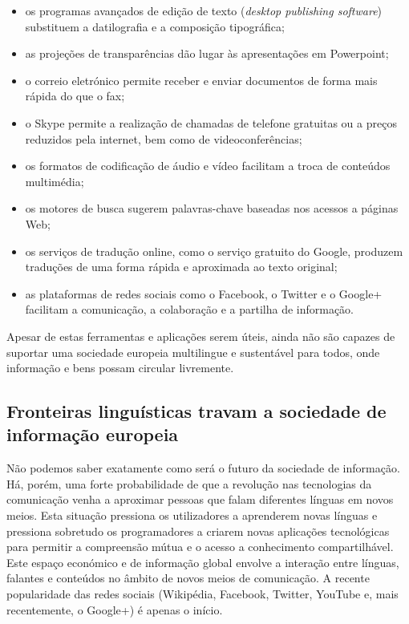 \documentclass[]{../metanetpaper}
\begin{document}
\begin{multicols}{2}
\begin{itemize}
      \item os programas avançados de edição de texto (\textit{desktop publishing software}) substituem a datilografia e a composição tipográfica;
      \item as projeções de transparências dão lugar às apresentações em Powerpoint;
      \item o correio eletrónico permite receber e enviar do\-cu\-men\-tos de forma mais rápida do que o fax;
      \item o Skype permite a realização de chamadas de telefone gratuitas ou a preços reduzidos pela internet, bem como de videoconferências;
      \item os formatos de codificação de áudio e vídeo facilitam a troca de conteúdos multimédia;
      \item os motores de busca sugerem palavras-chave baseadas nos acessos a páginas Web;
      \item os serviços de tradução online, como o serviço gratuito do Google, produzem traduções de uma forma rápida e aproximada ao texto original;
      \item as plataformas de redes sociais como o Facebook, o Twitter e o Google+  facilitam a comunicação, a colaboração e a partilha de informação.
\end{itemize}

 Apesar de estas ferramentas e aplicações serem úteis, ainda não são capazes de suportar uma sociedade europeia multilingue e sustentável para todos, onde informação e bens possam circular livremente.

\subsection{Fronteiras linguísticas travam a sociedade de in\-for\-ma\-ção eu\-ro\-peia}
  
Não podemos saber exatamente como será o futuro da sociedade de informação. Há, porém, uma forte probabilidade de que a revolução nas tecnologias da comunicação venha a aproximar pessoas que falam diferentes línguas em novos meios. Esta situação pressiona os utilizadores a aprenderem novas línguas e pressiona sobretudo os programadores a criarem novas aplicações tecnológicas para permitir a compreensão mútua e o acesso a conhecimento compartilhável. Este espaço económico e de informação global envolve a interação entre línguas, falantes e conteúdos no âmbito de novos meios de comunicação. A recente popularidade das redes sociais (Wikipédia, Facebook, Twitter, YouTube e, mais recentemente, o Google+) é apenas o início. 


\end{multicols}
\end{document}
